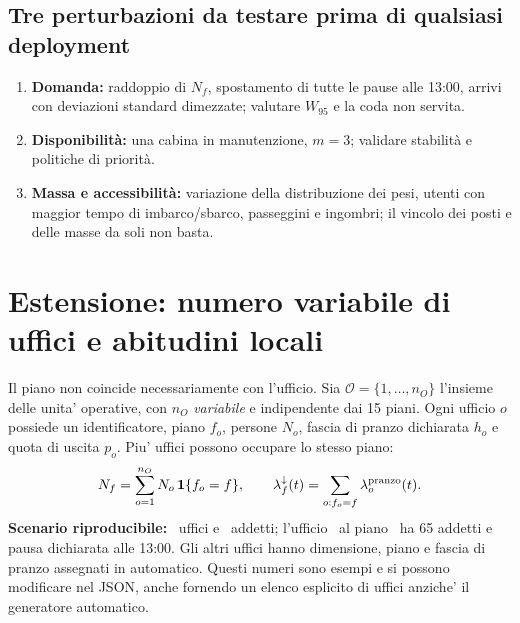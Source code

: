 \documentclass[11pt,a4paper]{article}
\newcommand{\secname}[1]{\vspace{1mm}\section{#1}}
\begin{document}
\subsection{Tre perturbazioni da testare prima di qualsiasi deployment}
\begin{enumerate}[leftmargin=7mm]
\item \textbf{Domanda:} raddoppio di \(N_f\), spostamento di tutte le pause alle 13:00, arrivi con deviazioni standard dimezzate; valutare \(W_{95}\) e la coda non servita.
\item \textbf{Disponibilit\`a:} una cabina in manutenzione, \(m=3\); validare stabilit\`a e politiche di priorit\`a.
\item \textbf{Massa e accessibilit\`a:} variazione della distribuzione dei pesi, utenti con maggior tempo di imbarco/sbarco, passeggini e ingombri; il vincolo dei posti e delle masse da soli non basta.
\end{enumerate}
\newpage

\newpage
\secname{Estensione: numero variabile di uffici e abitudini locali}
Il piano non coincide necessariamente con l'ufficio. Sia $\mathcal O=\{1,\ldots,n_O\}$ l'insieme delle unita' operative, con $n_O$ \emph{variabile} e indipendente dai 15 piani. Ogni ufficio $o$ possiede un identificatore, piano $f_o$, persone $N_o$, fascia di pranzo dichiarata $h_o$ e quota di uscita $p_o$. Piu' uffici possono occupare lo stesso piano:
\begin{equation}
 N_f=\sum_{o=1}^{n_O}N_o\,\mathbf 1\{f_o=f\},\qquad
 \lambda_f^{\downarrow}(t)=\sum_{o:f_o=f}\lambda_o^{\rm pranzo}(t).
\end{equation}
\textbf{Scenario riproducibile:} \Noffices\ uffici e \Nstaff\ addetti; l'ufficio \texttt{\Nfocus}\ al piano \Nfocusfloor\ ha 65 addetti e pausa dichiarata alle 13:00. Gli altri uffici hanno dimensione, piano e fascia di pranzo assegnati in automatico. Questi numeri sono esempi e si possono modificare nel JSON, anche fornendo un elenco esplicito di uffici anziche' il generatore automatico.
\end{document}
